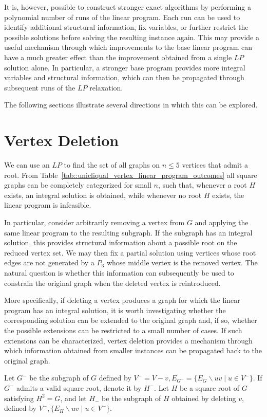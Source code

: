\documentclass[11pt]{report}
\begin{document}
It is, however, possible to construct stronger exact algorithms by performing a polynomial number of runs of the linear program. Each run can be used to identify additional structural information, fix variables, or further restrict the possible solutions before solving the resulting instance again. This may provide a useful mechanism through which improvements to the base linear program can have a much greater effect than the improvement obtained from a single $LP$ solution alone. In particular, a stronger base program provides more integral variables and structural information, which can then be propagated through subsequent runs of the $LP$ relaxation.

The following sections illustrate several directions in which this can be explored. 

\section{Vertex Deletion} \label{sec::vertex_deletion}

We can use an $LP$ to find the set of all graphs on $n \leq 5$ vertices that admit a root. From Table~\eqref{tab::unicliqual_vertex_linear_program_outcomes} all square graphs can be completely categorized for small $n$, such that, whenever a root $H$ exists, an integral solution is obtained, while whenever no root $H$ exists, the linear program is infeasible. 

In particular, consider arbitrarily removing a vertex from $G$ and applying the same linear program to the resulting subgraph. If the subgraph has an integral solution, this provides structural information about a possible root on the reduced vertex set. We may then fix a partial solution using vertices whose root edges are not generated by a $P_3$ whose middle vertex is the removed vertex. The natural question is whether this information can subsequently be used to constrain the original graph when the deleted vertex is reintroduced.

More specifically, if deleting a vertex produces a graph for which the linear program has an integral solution, it is worth investigating whether the corresponding solution can be extended to the original graph and, if so, whether the possible extensions can be restricted to a small number of cases. If such extensions can be characterized, vertex deletion provides a mechanism through which information obtained from smaller instances can be propagated back to the original graph.

Let $G^-$ be the subgraph of $G$ defined by $\displaystyle V^- = V - {v}, E_{G^-} =  \{ E_G \backslash {uv \mid u \in V^-} \}$. If $G^-$ admits a valid square root, denote it by $H^-$. Let $H$ be a square root of $G$ satisfying $H^2=G$, and let $H_-$ be the subgraph of $H$ obtained by deleting $v$, defined by $\displaystyle V^-, \{ E_H \backslash {uv \mid u \in V^-}\}$. 
\end{document}
